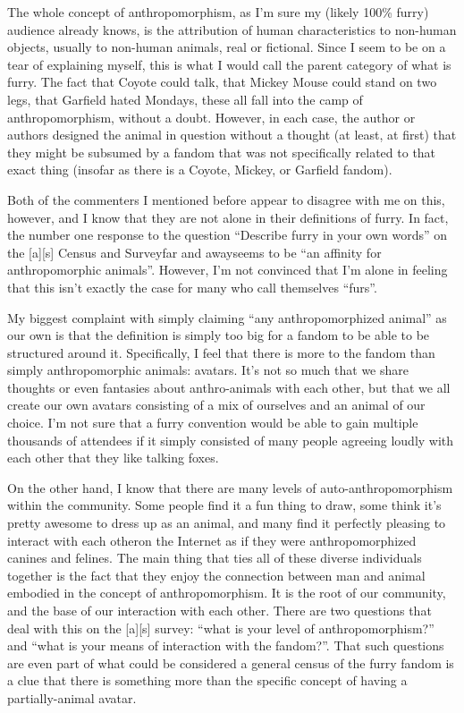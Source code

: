 The whole concept of anthropomorphism, as I'm sure my (likely 100\% furry) audience already knows, is the attribution of human characteristics to non-human objects, usually to non-human animals, real or fictional. Since I seem to be on a tear of explaining myself, this is what I would call the parent category of what is furry. The fact that Coyote could talk, that Mickey Mouse could stand on two legs, that Garfield hated Mondays, these all fall into the camp of anthropomorphism, without a doubt. However, in each case, the author or authors designed the animal in question without a thought (at least, at first) that they might be subsumed by a fandom that was not specifically related to that exact thing (insofar as there is a Coyote, Mickey, or Garfield fandom).

Both of the commenters I mentioned before appear to disagree with me on this, however, and I know that they are not alone in their definitions of furry. In fact, the number one response to the question ``Describe furry in your own words'' on the {[}a{]}{[}s{]} Census and Surveyfar and awayseems to be ``an affinity for anthropomorphic animals''. However, I'm not convinced that I'm alone in feeling that this isn't exactly the case for many who call themselves ``furs''.

My biggest complaint with simply claiming ``any anthropomorphized animal'' as our own is that the definition is simply too big for a fandom to be able to be structured around it. Specifically, I feel that there is more to the fandom than simply anthropomorphic animals: avatars. It's not so much that we share thoughts or even fantasies about anthro-animals with each other, but that we all create our own avatars consisting of a mix of ourselves and an animal of our choice. I'm not sure that a furry convention would be able to gain multiple thousands of attendees if it simply consisted of many people agreeing loudly with each other that they like talking foxes.

On the other hand, I know that there are many levels of auto-anthropomorphism within the community. Some people find it a fun thing to draw, some think it's pretty awesome to dress up as an animal, and many find it perfectly pleasing to interact with each otheron the Internet as if they were anthropomorphized canines and felines. The main thing that ties all of these diverse individuals together is the fact that they enjoy the connection between man and animal embodied in the concept of anthropomorphism. It is the root of our community, and the base of our interaction with each other. There are two questions that deal with this on the {[}a{]}{[}s{]} survey: ``what is your level of anthropomorphism?'' and ``what is your means of interaction with the fandom?''. That such questions are even part of what could be considered a general census of the furry fandom is a clue that there is something more than the specific concept of having a partially-animal avatar.

